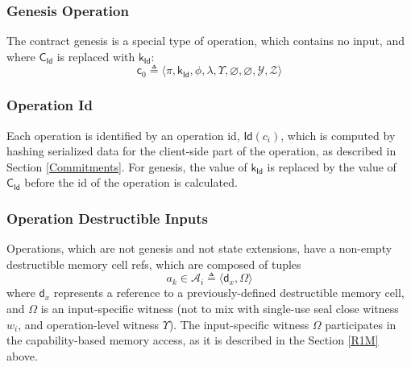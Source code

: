 \documentclass[9pt,oneside]{amsart}
\begin{document}
\begin{multicols}{2}
\subsubsection{Genesis Operation}

The contract \gls{genesis} is a special type of operation, which contains no input,
and where $\mathsf{C_{Id}}$ is replaced with $\mathsf{k_{Id}}$:
\noindent
\begin{equation}
\mathsf{c}_0 \triangleq \langle \pi, \mathsf{k_{Id}}, \phi, \lambda, \Upsilon, \varnothing, \varnothing, \mathcal{Y}, \mathcal{Z} \rangle
\end{equation}

\subsubsection{Operation Id}

Each operation is identified by an operation id, $\mathsf{Id}(c_i)$, which is computed by
hashing serialized data for the client-side part of the operation,
as described in Section \ref{Commitments}. For genesis, the value of $\mathsf{k_{Id}}$
is replaced by the value of $\mathsf{C_{Id}}$ before the id of the operation is calculated.

\subsubsection{Operation Destructible Inputs}\label{Input}

Operations, which are not \gls{genesis} and not \glspl{state extension},
have a non-empty destructible memory cell refs, which are composed of tuples
\noindent
\begin{equation}\label{eq:input}
a_k \in \mathcal{A}_i \triangleq \langle \mathsf{d}_x, \Omega \rangle
\end{equation}
\noindent
where $\mathsf{d}_x$ represents a reference to a previously-defined destructible memory cell,
and $\Omega$ is an \gls{input-specific witness}
(not to mix with single-use \gls{seal close witness} $w_i$,
and \gls{operation-level witness} $\Upsilon$).
The \gls{input-specific witness} $\Omega$ participates in the capability-based memory access,
as it is described in the Section \ref{R1M} above.

\end{multicols}
\end{document}
